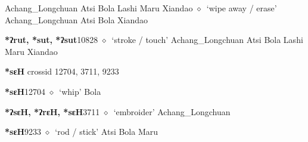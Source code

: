 \begin{list}{}{\leftmargin=1.5em \itemindent=-1.5em}
\hspace{1ex}
         Achang\_Longchuan 
\hspace{1ex}
         Atsi 
\hspace{1ex}
         Bola 
\hspace{1ex}
         Lashi 
\hspace{1ex}
         Maru 
\hspace{1ex}
         Xiandao 
\hspace{1ex}
         $\diamond$~`wipe away / erase'
         Achang\_Longchuan 
\hspace{1ex}
         Atsi 
\hspace{1ex}
         Bola 
\hspace{1ex}
         Xiandao 
  \item {\footnotesize \textbf{*ʔrut, *sut, *ʔsut}}{\tiny 10828}
\hspace{1ex}
         $\diamond$~`stroke / touch'
         Achang\_Longchuan 
\hspace{1ex}
         Atsi 
\hspace{1ex}
         Bola 
\hspace{1ex}
         Lashi 
\hspace{1ex}
         Maru 
\hspace{1ex}
         Xiandao 
  \end{list}
\item
\textbf{*sɛH}
  {\tiny crossid 12704, 3711, 9233}
  \begin{list}{}{\leftmargin=1.5em \itemindent=-1.5em}
  \item {\footnotesize \textbf{*sɛH}}{\tiny 12704}
         $\diamond$~`whip'
         Bola 
  \item {\footnotesize \textbf{*ʔsɛH, *ʔrɛH, *sɛH}}{\tiny 3711}
\hspace{1ex}
         $\diamond$~`embroider'
         Achang\_Longchuan 
  \item {\footnotesize \textbf{*sɛH}}{\tiny 9233}
\hspace{1ex}
         $\diamond$~`rod / stick'
         Atsi 
\hspace{1ex}
         Bola 
\hspace{1ex}
         Maru 
  \end{list}
